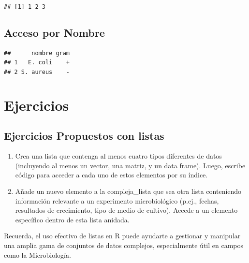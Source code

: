 \documentclass[
]{book}
\newenvironment{Shaded}{\begin{snugshade}}{\end{snugshade}}
\newcommand{\CommentTok}[1]{\textcolor[rgb]{0.56,0.35,0.01}{\textit{#1}}}
\newcommand{\FunctionTok}[1]{\textcolor[rgb]{0.13,0.29,0.53}{\textbf{#1}}}
\newcommand{\NormalTok}[1]{#1}
\newcommand{\OtherTok}[1]{\textcolor[rgb]{0.56,0.35,0.01}{#1}}
\newcommand{\SpecialCharTok}[1]{\textcolor[rgb]{0.81,0.36,0.00}{\textbf{#1}}}
\begin{document}
\begin{verbatim}
## [1] 1 2 3
\end{verbatim}

\subsection{Acceso por Nombre}\label{acceso-por-nombre}

\begin{Shaded}
\end{Shaded}

\begin{verbatim}
##      nombre gram
## 1   E. coli    +
## 2 S. aureus    -
\end{verbatim}

\section{Ejercicios}\label{ejercicios-2}

\subsection{Ejercicios Propuestos con listas}\label{ejercicios-propuestos-con-listas}

\begin{enumerate}
\def\labelenumi{\arabic{enumi}.}
\item
  Crea una lista que contenga al menos cuatro tipos diferentes de datos (incluyendo al menos un vector, una matriz, y un data frame). Luego, escribe código para acceder a cada uno de estos elementos por su índice.
\item
  Añade un nuevo elemento a la compleja\_lista que sea otra lista conteniendo información relevante a un experimento microbiológico (p.ej., fechas, resultados de crecimiento, tipo de medio de cultivo). Accede a un elemento específico dentro de esta lista anidada.
\end{enumerate}

Recuerda, el uso efectivo de listas en R puede ayudarte a gestionar y manipular una amplia gama de conjuntos de datos complejos, especialmente útil en campos como la Microbiología.
\end{document}
